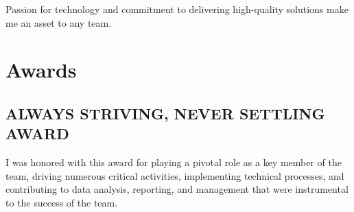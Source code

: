 \documentclass[]{resume-openfont}
\begin{document}
\begin{minipage}[t]{0.66\textwidth}
\begin{tightemize}
\item Passion for technology and commitment to delivering high-quality solutions
make me an asset to any team.\newline
\end{tightemize}
\sectionsep




\section{Awards} 
\subsection{ALWAYS STRIVING, NEVER SETTLING AWARD}
\vspace{\topsep} %
\begin{tightemize}
\item I was honored with this award for playing a pivotal role as a key member of the team, driving numerous critical activities, implementing technical processes, and contributing to data analysis, reporting, and management that were instrumental to the success of the team.
\end{tightemize}
\sectionsep



\end{minipage} 
\end{document}
